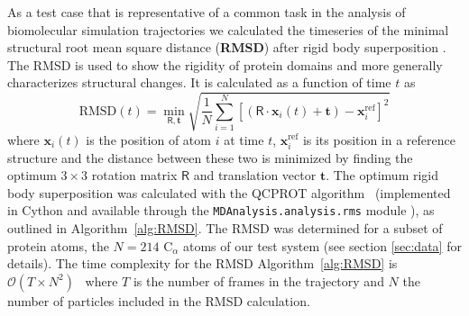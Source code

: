 As a test case that is representative of a common task in the analysis of biomolecular simulation trajectories we calculated the timeseries of the minimal structural root mean square distance  (\textbf{RMSD}) after rigid body superposition \cite{Lea96, Mura:2014kx}.
The RMSD is used to show the rigidity of protein domains and more generally characterizes structural changes.
It is calculated as a function of time $t$ as
\begin{equation}
  \label{eq:rmsd}
  \text{RMSD}(t) = \min_{\mathsf{R}, \mathbf{t}} %
  \sqrt{\frac{1}{N} \sum_{i=1}^{N} \left[ %
      (\mathsf{R}\cdot\mathbf{x}_{i}(t) + \mathbf{t}) - \mathbf{x}_{i}^{\text{ref}} \right]^{2}}
\end{equation}
where $\mathbf{x}_{i}(t)$ is the position of atom $i$ at time $t$, $\mathbf{x}_{i}^{\text{ref}}$ is its position in a reference structure and the distance between these two is minimized by finding the optimum $3\times3$ rotation matrix $\mathsf{R}$ and translation vector $\mathbf{t}$. 
The optimum rigid body superposition was calculated with the QCPROT algorithm~\cite{Liu:2010kx,Theobald:2005vn} (implemented in Cython and available through the \texttt{MDAnalysis.analysis.rms} module \cite{Gowers:2016aa}), as outlined in Algorithm~\ref{alg:RMSD}. 
The RMSD was determined for a subset of protein atoms, the $N=214$  C$_{\alpha}$ atoms of our test system (see section \ref{sec:data} for details).
The time complexity for the RMSD Algorithm~\ref{alg:RMSD} is $\mathcal{O}(T \times N^{2})$~\cite{Liu:2010kx} where $T$ is the number of frames in the trajectory and $N$ the number of particles included in the RMSD calculation.

